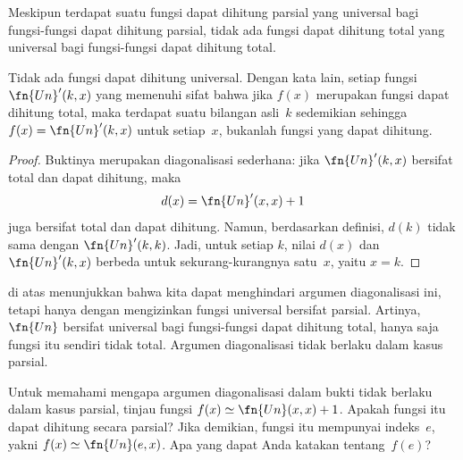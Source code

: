 \documentclass[../../../include/open-logic-section]{subfiles}
\begin{document}

Meskipun terdapat suatu fungsi dapat dihitung parsial yang universal bagi
fungsi-fungsi dapat dihitung parsial, tidak ada fungsi dapat dihitung total yang
universal bagi fungsi-fungsi dapat dihitung total.

\begin{thm}
Tidak ada fungsi dapat dihitung universal. Dengan kata lain, setiap fungsi
$\fn{Un}'(k, x)$ yang memenuhi sifat bahwa jika $f(x)$ merupakan fungsi dapat
dihitung total, maka terdapat suatu bilangan asli~$k$ sedemikian sehingga
$f(x) = \fn{Un}'(k,x)$ untuk setiap~$x$, bukanlah fungsi yang dapat dihitung.
\end{thm}

\begin{proof}
Buktinya merupakan diagonalisasi sederhana: jika $\fn{Un}'(k,x)$ bersifat
total dan dapat dihitung, maka
\[
d(x) = \fn{Un}'(x, x) + 1
\]
juga bersifat total dan dapat dihitung. Namun, berdasarkan definisi, $d(k)$
tidak sama dengan $\fn{Un}'(k,k)$. Jadi, untuk setiap $k$, nilai $d(x)$ dan
$\fn{Un}'(k, x)$ berbeda untuk sekurang-kurangnya satu~$x$, yaitu $x = k$.
\end{proof}

\begin{explain}
 di atas menunjukkan bahwa kita dapat menghindari
argumen diagonalisasi ini, tetapi hanya dengan mengizinkan fungsi universal
bersifat parsial. Artinya, $\fn{Un}$ bersifat universal bagi fungsi-fungsi dapat
dihitung total, hanya saja fungsi itu sendiri tidak total. Argumen
diagonalisasi tidak berlaku dalam kasus parsial.
\end{explain}

\begin{prob}
  Untuk memahami mengapa argumen diagonalisasi dalam bukti
   tidak berlaku dalam kasus parsial, tinjau fungsi
  $f(x) \simeq \fn{Un}(x,x)+1$. Apakah fungsi itu dapat dihitung secara
  parsial? Jika demikian, fungsi itu mempunyai indeks~$e$, yakni
  $f(x) \simeq \fn{Un}(e,x)$. Apa yang dapat Anda katakan tentang~$f(e)$?
\end{prob}
\end{document}
